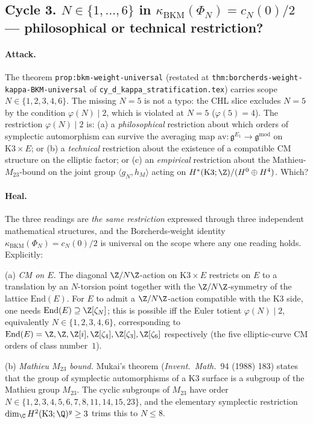 \subsection*{Cycle 3. $N \in \{1, \ldots, 6\}$ in
  $\kappa_{\mathrm{BKM}}(\Phi_N) = c_N(0)/2$ --- philosophical or
  technical restriction?}

\paragraph{Attack.} The theorem
\texttt{prop:bkm-weight-universal} (restated at
\texttt{thm:borcherds-weight-kappa-BKM-universal} of
\texttt{cy\_d\_kappa\_stratification.tex}) carries scope
$N \in \{1, 2, 3, 4, 6\}$. The missing $N = 5$ is not a typo: the
CHL slice excludes $N = 5$ by the condition $\varphi(N) \mid 2$,
which is violated at $N = 5$ ($\varphi(5) = 4$). The restriction
$\varphi(N) \mid 2$ is: (a) a \emph{philosophical} restriction
about which orders of symplectic automorphism can survive the
averaging map $\mathrm{av}: \mathfrak{g}^{E_1} \to
\mathfrak{g}^{\mathrm{mod}}$ on $\mathrm{K3} \times E$; or (b) a
\emph{technical} restriction about the existence of a compatible
CM structure on the elliptic factor; or (c) an \emph{empirical}
restriction about the Mathieu-$M_{23}$-bound on the joint group
$\langle g_N, h_M \rangle$ acting on
$H^*(\mathrm{K3}; \Z)/(H^0 \oplus H^4)$. Which?

\paragraph{Heal.} The three readings are \emph{the same
restriction} expressed through three independent mathematical
structures, and the Borcherds-weight identity $\kappa_{\mathrm{BKM}}
(\Phi_N) = c_N(0)/2$ is universal on the scope where any one
reading holds. Explicitly:

(a) \emph{CM on $E$.} The diagonal $\Z/N\Z$-action on $\mathrm{K3}
\times E$ restricts on $E$ to a translation by an $N$-torsion
point together with the $\Z/N\Z$-symmetry of the lattice
$\mathrm{End}(E)$. For $E$ to admit a $\Z/N\Z$-action
compatible with the K3 side, one needs
$\mathrm{End}(E) \supseteq \Z[\zeta_N]$; this is possible iff the
Euler totient $\varphi(N) \mid 2$, equivalently $N \in \{1, 2, 3,
4, 6\}$, corresponding to $\mathrm{End}(E) =
\Z, \Z, \Z[i], \Z[\zeta_4], \Z[\zeta_3], \Z[\zeta_6]$
respectively (the five elliptic-curve CM orders of class number~$1$).

(b) \emph{Mathieu $M_{23}$ bound.} Mukai's theorem
(\emph{Invent.\ Math.}~94 (1988) 183) states that the group
of symplectic automorphisms of a K3 surface is a subgroup of the
Mathieu group $M_{23}$. The cyclic subgroups of $M_{23}$ have
order $N \in \{1, 2, 3, 4, 5, 6, 7, 8, 11, 14, 15, 23\}$, and the
elementary symplectic restriction $\dim_\C H^2(\mathrm{K3}; \Q)^g
\geq 3$ trims this to $N \leq 8$.

